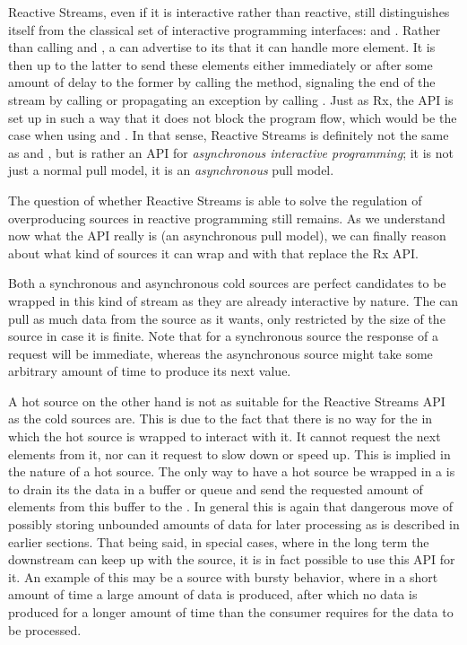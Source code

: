 Reactive Streams, even if it is interactive rather than reactive, still distinguishes itself from the classical set of interactive programming interfaces: \ieb and \ier. Rather than calling  and , a  can advertise to its  that it can handle  more element. It is then up to the latter to send these elements either immediately or after some amount of delay to the former by calling the  method, signaling the end of the stream by calling  or propagating an exception by calling . Just as Rx, the API is set up in such a way that it does not block the program flow, which would be the case when using \ieb and \ier. In that sense, Reactive Streams is definitely not the same as \ieb and \ier, but is rather an API for \textit{asynchronous interactive programming}; it is not just a normal pull model, it is an \textit{asynchronous} pull model.

The question of whether Reactive Streams is able to solve the regulation of overproducing sources in reactive programming still remains. As we understand now what the API really is (an asynchronous pull model), we can finally reason about what kind of sources it can wrap and with that replace the Rx API.

Both a synchronous and asynchronous cold sources are perfect candidates to be wrapped in this kind of stream as they are already interactive by nature. The  can pull as much data from the source as it wants, only restricted by the size of the source in case it is finite. Note that for a synchronous source the response of a request will be immediate, whereas the asynchronous source might take some arbitrary amount of time to produce its next value.

A hot source on the other hand is not as suitable for the Reactive Streams API as the cold sources are. This is due to the fact that there is no way for the  in which the hot source is wrapped to interact with it. It cannot request the next  elements from it, nor can it request to slow down or speed up. This is implied in the nature of a hot source\cite{berry1991-Reactive}. The only way to have a hot source be wrapped in a  is to drain its the data in a buffer or queue and send the requested amount of elements from this buffer to the . In general this is again that dangerous move of possibly storing unbounded amounts of data for later processing as is described in earlier sections. That being said, in special cases, where in the long term the downstream can keep up with the source, it is in fact possible to use this API for it. An example of this may be a source with bursty behavior, where in a short amount of time a large amount of data is produced, after which no data is produced for a longer amount of time than the consumer requires for the data to be processed.

